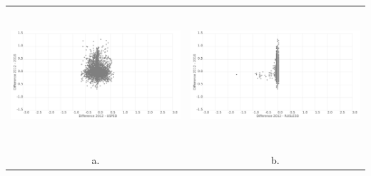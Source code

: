 \documentclass{standalone}
\begin{document}
\tiny
\centering 

\begin{tabular}{m{} m{}}
\multicolumn{1}{c}{\includegraphics[height=50mm]{../../images/graphs/scatterplot_diff_baseline_usped.png}}
& \multicolumn{1}{c}{\includegraphics[height=50mm]{../../images/graphs/scatterplot_diff_baseline_rusle.png}}\\
\\
\multicolumn{1}{c}{a.} 
& \multicolumn{1}{c}{b.}\\
\end{tabular}


\end{document}
